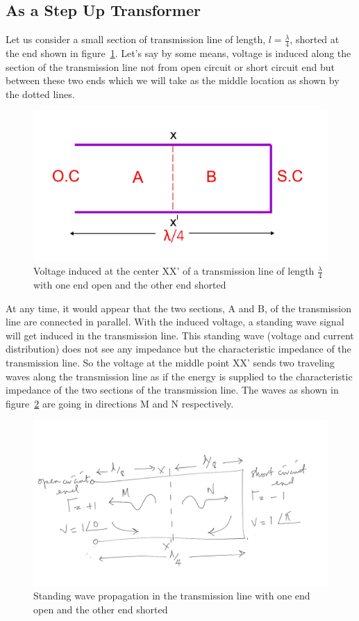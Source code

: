 \subsection{As a Step Up Transformer}
Let us consider a small section of transmission line of length, $l = \frac{\lambda}{4}$, shorted at the end shown in figure~\ref{fig:fig5}. Let's say by some means, voltage is induced along the section of the transmission line not from open circuit or short circuit end but between these two ends which we will take as the middle location as shown by the dotted lines.
\begin{figure}[h]
\centering
\includegraphics[width=1\linewidth]{./graphics/fig5}
\caption{Voltage induced at the center XX' of a transmission line of length $\frac{\lambda}{4}$ with one end open and the other end shorted}
\label{fig:fig5}
\end{figure}

 At any time, it would appear that the two sections, A and B, of the transmission line are connected in parallel. With the induced voltage, a standing wave signal will get induced in the transmission line. This standing wave (voltage and current distribution) does not see any impedance but the characteristic impedance of the transmission line. So the voltage at the middle point XX' sends two traveling waves along the transmission line as if the energy is supplied to the characteristic impedance of the two sections of the transmission line. The waves as shown in figure~\ref{fig:fig6} are going in directions M and N respectively.
 \begin{figure}[h]
\centering
\includegraphics[width=1\linewidth]{./graphics/step_up_transformer_temp}
\caption{Standing wave propagation in the transmission line with one end open and the other end shorted}
\label{fig:fig6}
\end{figure}

